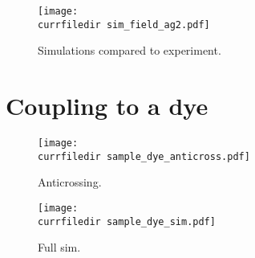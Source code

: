 \begin{figure}
  \texttt{[image: \\currfiledir sim\_field\_ag2.pdf]}
  \caption{Simulations compared to experiment. \label{fig:8_sim_without_dye} }
\end{figure}
  

  \section{Coupling to a dye}

  \begin{figure}
    \texttt{[image: \\currfiledir sample\_dye\_anticross.pdf]}
    \caption{Anticrossing. \label{fig:8_sample_dye_anticross} }
  \end{figure}
    


  \begin{figure}
    \texttt{[image: \\currfiledir sample\_dye\_sim.pdf]}
    \caption{Full sim. \label{fig:8_sample_dye_sim} }
  \end{figure}
    



\printbibliography[segment=\therefsegment,heading=subbibliography]




